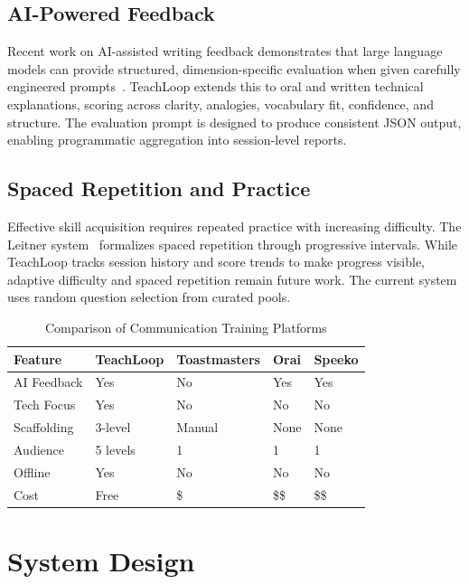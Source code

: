 \documentclass[11pt]{article}
\begin{document}
\subsection{AI-Powered Feedback}

Recent work on AI-assisted writing feedback demonstrates that large language models can provide structured, dimension-specific evaluation when given carefully engineered prompts~\cite{deeplearning}. TeachLoop extends this to oral and written technical explanations, scoring across clarity, analogies, vocabulary fit, confidence, and structure. The evaluation prompt is designed to produce consistent JSON output, enabling programmatic aggregation into session-level reports.

\subsection{Spaced Repetition and Practice}

Effective skill acquisition requires repeated practice with increasing difficulty. The Leitner system~\cite{leitner} formalizes spaced repetition through progressive intervals. While TeachLoop tracks session history and score trends to make progress visible, adaptive difficulty and spaced repetition remain future work. The current system uses random question selection from curated pools.

\begin{table}[!t]
\centering
\caption{Comparison of Communication Training Platforms}
\label{tab:comparison}
\begin{tabularx}{\columnwidth}{lXXXX}
\toprule
\textbf{Feature} & \textbf{TeachLoop} & \textbf{Toastmasters} & \textbf{Orai} & \textbf{Speeko} \\
\midrule
AI Feedback & Yes & No & Yes & Yes \\
Tech Focus & Yes & No & No & No \\
Scaffolding & 3-level & Manual & None & None \\
Audience & 5 levels & 1 & 1 & 1 \\
Offline & Yes & No & No & No \\
Cost & Free & \$ & \$\$ & \$\$ \\
\bottomrule
\end{tabularx}
\end{table}

\section{System Design}
\label{sec:design}
\end{document}
